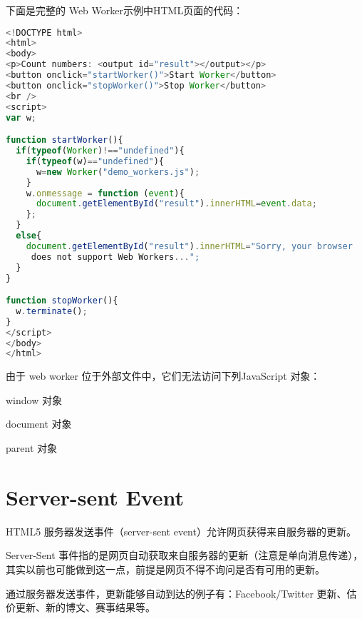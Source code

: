 下面是完整的 Web Worker示例中HTML页面的代码：

\begin{lstlisting}[language=JavaScript]
<!DOCTYPE html>
<html>
<body>
<p>Count numbers: <output id="result"></output></p>
<button onclick="startWorker()">Start Worker</button>
<button onclick="stopWorker()">Stop Worker</button>
<br />
<script>
var w;

function startWorker(){
  if(typeof(Worker)!=="undefined"){
    if(typeof(w)=="undefined"){
      w=new Worker("demo_workers.js");
    }
    w.onmessage = function (event){
      document.getElementById("result").innerHTML=event.data;
    };
  }
  else{
    document.getElementById("result").innerHTML="Sorry, your browser
     does not support Web Workers...";
  }
}

function stopWorker(){
  w.terminate();
}
</script>
</body>
</html>
\end{lstlisting}

由于 web worker 位于外部文件中，它们无法访问下列JavaScript 对象：


\begin{compactitem}
\item window 对象
\item document 对象
\item parent 对象
\end{compactitem}


\section{Server-sent Event}

HTML5 服务器发送事件（server-sent event）允许网页获得来自服务器的更新。

Server-Sent 事件指的是网页自动获取来自服务器的更新（注意是单向消息传递），其实以前也可能做到这一点，前提是网页不得不询问是否有可用的更新。

通过服务器发送事件，更新能够自动到达的例子有：Facebook/Twitter 更新、估价更新、新的博文、赛事结果等。

